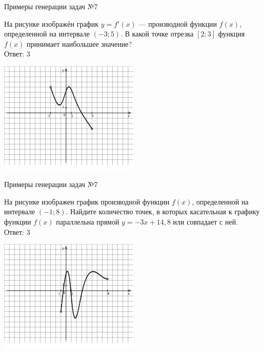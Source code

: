 \documentclass[aspectratio=169]{beamer}
\begin{document}
\begin{frame}{Примеры генерации задач №7}
    
    \begin{multicols}{2}
        На рисунке изображён график $y=f'(x)$ — производной функции $f(x)$, определенной на интервале $(-3;5)$. В какой точке отрезка $[2; 3]$ функция $f(x)$ принимает наибольшее значение?\\

        Ответ: $3$

        \includegraphics[width=0.5\textwidth]{images/9299084059373277n0}
    \end{multicols}
          
\end{frame}

\begin{frame}{Примеры генерации задач №7}
    
    \begin{multicols}{2}
        На рисунке изображен график производной функции $f(x)$, определенной на интервале $(-1; 8)$. Найдите количество точек, в которых касательная к графику функции $f(x)$ параллельна прямой $y=-3x+ 14{,}8 $ или совпадает с ней.\\

        Ответ: $3$

        \includegraphics[width=0.5\textwidth]{images/776525944899729n0}
      \end{multicols}
        
   
\end{frame}
\end{document}
